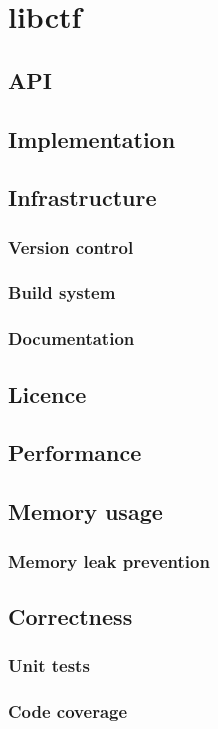 \chapter{libctf}

\section{API}
\section{Implementation}
\section{Infrastructure}
\subsection{Version control}
\subsection{Build system}
\subsection{Documentation}
\section{Licence}
\section{Performance}
\section{Memory usage}
\subsection{Memory leak prevention}
\section{Correctness}
\subsection{Unit tests}
\subsection{Code coverage}

